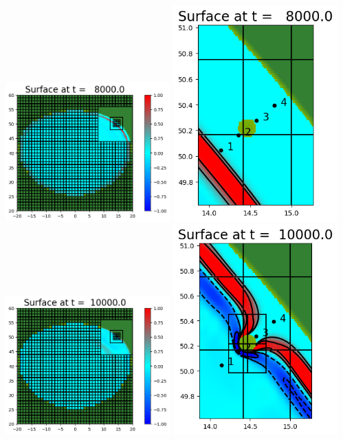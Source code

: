 \documentclass[11pt]{article}
\begin{document}
\vskip 10pt 
\includegraphics[width=0.475\textwidth]{frame0004fig0.png}
\includegraphics[width=0.475\textwidth]{frame0004fig7.png}
\vskip 10pt 
\includegraphics[width=0.475\textwidth]{frame0005fig0.png}
\includegraphics[width=0.475\textwidth]{frame0005fig7.png}
\end{document}
